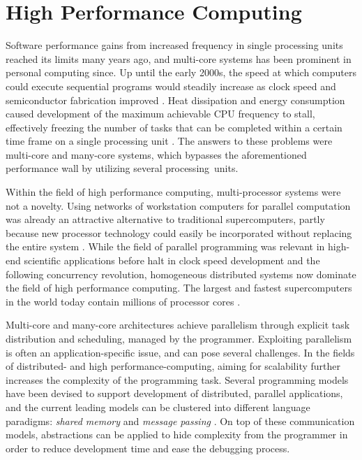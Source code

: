 \documentclass{uit-report}
\begin{document}
%  
\section{High Performance Computing}

Software performance gains from increased frequency in single processing units reached its limits many years ago, and multi-core systems has been prominent in personal computing since. Up until the early 2000s, the speed at which computers could execute sequential programs would steadily increase as clock speed and semiconductor fabrication improved \cite{sutter_larus_2005}. Heat dissipation and energy consumption caused development of the maximum achievable CPU frequency to stall, effectively freezing the number of tasks that can be completed within a certain time frame on a single processing unit \cite{diaz_munoz-caro_nino_2012}. The answers to these problems were multi-core and many-core systems, which bypasses the aforementioned performance wall by utilizing several processing~units.


Within the field of high performance computing, multi-processor systems were not a novelty. Using networks of workstation computers for parallel computation was already an attractive alternative to traditional supercomputers, partly because new processor technology could easily be incorporated without replacing the entire system \cite{wilkinson_allen_2005}. While the field of parallel programming was relevant in high-end scientific applications before halt in clock speed development and the following concurrency revolution, homogeneous distributed systems now dominate the field of high performance computing. The largest and fastest supercomputers in the world today contain millions of processor cores \cite{top500}.


Multi-core and many-core architectures achieve parallelism through explicit task distribution and scheduling, managed by the programmer. Exploiting parallelism is often an application-specific issue, and can pose several challenges. In the fields of distributed- and high performance-computing, aiming for scalability further increases the complexity of the programming task. Several programming models have been devised to support development of distributed, parallel applications, and the current leading models can be clustered into different language paradigms: \emph{shared memory }and \emph{message passing} \cite{pgas_languages}. On top of these communication models, abstractions can be applied to hide complexity from the programmer in order to reduce development time and ease the debugging process. 
\end{document}
